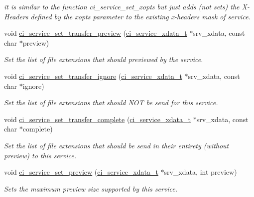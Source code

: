 \begin{DoxyCompactItemize}
\begin{DoxyCompactList}\small\item\em it is similar to the function ci\_\-service\_\-set\_\-xopts but just adds (not sets) the X-\/Headers defined by the xopts parameter to the existing x-\/headers mask of service. \item\end{DoxyCompactList}\item 
void \hyperlink{group__SERVICES_gafc50c2c4ef2c9d96c7f8d6c2f2bf5d2f}{ci\_\-service\_\-set\_\-transfer\_\-preview} (\hyperlink{group__SERVICES_ga033e7bb0a88b3619abbc17230ad98eb4}{ci\_\-service\_\-xdata\_\-t} $\ast$srv\_\-xdata, const char $\ast$preview)
\begin{DoxyCompactList}\small\item\em Set the list of file extensions that should previewed by the service. \item\end{DoxyCompactList}\item 
void \hyperlink{group__SERVICES_gac7e9338092f802bc81dfb26dc2bf0e96}{ci\_\-service\_\-set\_\-transfer\_\-ignore} (\hyperlink{group__SERVICES_ga033e7bb0a88b3619abbc17230ad98eb4}{ci\_\-service\_\-xdata\_\-t} $\ast$srv\_\-xdata, const char $\ast$ignore)
\begin{DoxyCompactList}\small\item\em Set the list of file extensions that should NOT be send for this service. \item\end{DoxyCompactList}\item 
void \hyperlink{group__SERVICES_ga8390e88b95e0100d1a2728902f1d779b}{ci\_\-service\_\-set\_\-transfer\_\-complete} (\hyperlink{group__SERVICES_ga033e7bb0a88b3619abbc17230ad98eb4}{ci\_\-service\_\-xdata\_\-t} $\ast$srv\_\-xdata, const char $\ast$complete)
\begin{DoxyCompactList}\small\item\em Set the list of file extensions that should be send in their entirety (without preview) to this service. \item\end{DoxyCompactList}\item 
void \hyperlink{group__SERVICES_ga4baea98d2181bfa07189e048a889542a}{ci\_\-service\_\-set\_\-preview} (\hyperlink{group__SERVICES_ga033e7bb0a88b3619abbc17230ad98eb4}{ci\_\-service\_\-xdata\_\-t} $\ast$srv\_\-xdata, int preview)
\begin{DoxyCompactList}\small\item\em Sets the maximum preview size supported by this service. \item\end{DoxyCompactList}\item 

\end{DoxyCompactItemize}
